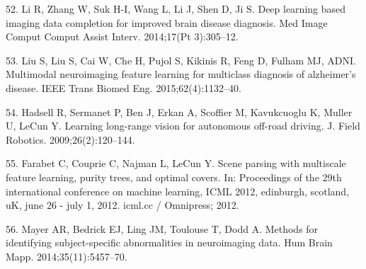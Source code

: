 \documentclass[11pt,]{article}
\begin{document}
\hypertarget{ref-Li:2014aa}{}
52. Li R, Zhang W, Suk H-I, Wang L, Li J, Shen D, Ji S. Deep learning
based imaging data completion for improved brain disease diagnosis. Med
Image Comput Comput Assist Interv. 2014;17(Pt 3):305--12.

\hypertarget{ref-Liu:2015aa}{}
53. Liu S, Liu S, Cai W, Che H, Pujol S, Kikinis R, Feng D, Fulham MJ,
ADNI. Multimodal neuroimaging feature learning for multiclass diagnosis
of alzheimer's disease. IEEE Trans Biomed Eng. 2015;62(4):1132--40.

\hypertarget{ref-HadsellSBESKML09}{}
54. Hadsell R, Sermanet P, Ben J, Erkan A, Scoffier M, Kavukcuoglu K,
Muller U, LeCun Y. Learning long-range vision for autonomous off-road
driving. J. Field Robotics. 2009;26(2):120--144.

\hypertarget{ref-FarabetCNL12}{}
55. Farabet C, Couprie C, Najman L, LeCun Y. Scene parsing with
multiscale feature learning, purity trees, and optimal covers. In:
Proceedings of the 29th international conference on machine learning,
ICML 2012, edinburgh, scotland, uK, june 26 - july 1, 2012. icml.cc /
Omnipress; 2012.

\hypertarget{ref-Mayer:2014aa}{}
56. Mayer AR, Bedrick EJ, Ling JM, Toulouse T, Dodd A. Methods for
identifying subject-specific abnormalities in neuroimaging data. Hum
Brain Mapp. 2014;35(11):5457--70.
\end{document}
